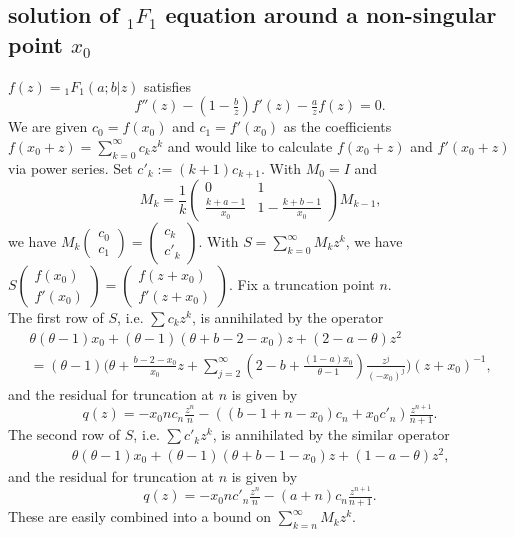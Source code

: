\documentclass[12pt]{article}
\numberwithin{equation}{section}
\begin{document}
\subsection{solution of ${}_1 F_1$ equation around a non-singular point $x_0$}
$f(z) = {}_1 F_1(a;b|z)$ satisfies
\begin{equation*}
f''(z) - (1-\tfrac{b}{z})f'(z) - \tfrac{a}{z} f(z) = 0\text{.}
\end{equation*}
We are given $c_0=f(x_0)$ and $c_1=f'(x_0)$ as the coefficients $
f(x_0+z) = \sum_{k=0}^{\infty} c_k z^k$ and would like to calculate $f(x_0+z)$ and $f'(x_0+z)$ via power series. Set $c'_k := (k+1)c_{k+1}$. With $M_0=I$ and
\begin{equation*}
M_k = \frac{1}{k} \begin{pmatrix} 0 & 1\\
\frac{k+a-1}{x_0} & 1 - \frac{k+b-1}{x_0}\end{pmatrix} M_{k-1}\text{,}
\end{equation*}
we have $M_k (\begin{smallmatrix} c_0 \\ c_1 \end{smallmatrix}) = (\begin{smallmatrix} c_k \\ c'_k \end{smallmatrix})$. With $S = \sum_{k=0}^{\infty} M_k z^k$, we have $S (\begin{smallmatrix} f(x_0) \\ f'(x_0) \end{smallmatrix}) = (\begin{smallmatrix} f(z+x_0) \\ f'(z+x_0)\end{smallmatrix})$. Fix a truncation point $n$.\\
The first row of $S$, i.e. $\sum c_k z^k$, is annihilated by the operator
\begin{gather*}
\theta(\theta-1) x_0 + (\theta-1)(\theta+b-2-x_0)z + (2-a-\theta)z^2 \\
= (\theta-1) \Big( \theta + \tfrac{b-2-x_0}{x_0} z +\sum_{j=2}^{\infty} (2-b+\tfrac{(1-a)x_0}{\theta-1})\tfrac{z^j}{(-x_0)^j} \Big) (z+x_0)^{-1}\text{,}
\end{gather*}
and the residual for truncation at $n$ is given by
\begin{equation*}
q(z) = -x_0 n c_n \tfrac{z^n}{n} - ((b-1+n-x_0)c_n + x_0 c'_n) \tfrac{z^{n+1}}{n+1}\text{.}
\end{equation*}
The second row of $S$, i.e. $\sum c'_k z^k$, is annihilated by the similar operator
\begin{gather*}
\theta(\theta-1) x_0 + (\theta-1)(\theta+b-1-x_0)z + (1-a-\theta)z^2\text{,}
\end{gather*}
and the residual for truncation at $n$ is given by
\begin{equation*}
q(z) = -x_0 n c'_n \tfrac{z^n}{n} - (a+n) c_n \tfrac{z^{n+1}}{n+1}\text{.}
\end{equation*}
These are easily combined into a bound on $\sum_{k=n}^{\infty} M_k z^k$.
\end{document}
